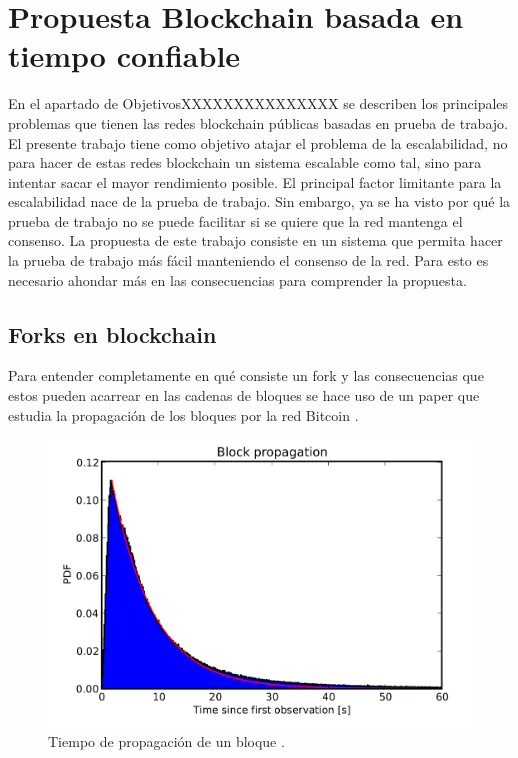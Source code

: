 \chapter{Propuesta Blockchain basada en tiempo confiable}
En el apartado de ObjetivosXXXXXXXXXXXXXXX se describen los principales problemas que tienen las redes blockchain públicas basadas en prueba de trabajo. El presente trabajo tiene como objetivo atajar el problema de la escalabilidad, no para hacer de estas redes blockchain un sistema escalable como tal, sino para intentar sacar el mayor rendimiento posible. El principal factor limitante para la escalabilidad nace de la prueba de trabajo. Sin embargo, ya se ha visto por qué la prueba de trabajo no se puede facilitar si se quiere que la red mantenga el consenso. La propuesta de este trabajo consiste en un sistema que permita hacer la prueba de trabajo más fácil manteniendo el consenso de la red. Para esto es necesario ahondar más en las consecuencias para comprender la propuesta.

\section{Forks en blockchain}
Para entender completamente en qué consiste un fork y las consecuencias que estos pueden acarrear en las cadenas de bloques se hace uso de un paper que estudia la propagación de los bloques por la red Bitcoin \cite{forks}. \newline

\begin{figure}
	\centering
	\includegraphics[width=1\textwidth]{imagenes/figura1.PNG}
	\caption{\label{fig1}Tiempo de propagación de un bloque \cite{forks}.}
\end{figure}

